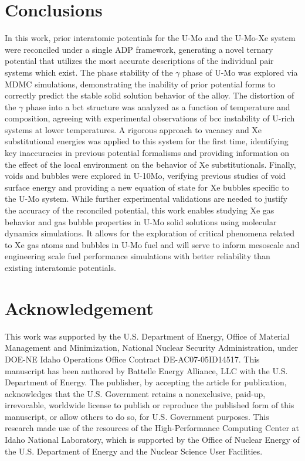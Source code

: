 \documentclass[review]{elsarticle}
\begin{document}
\FloatBarrier

\section{Conclusions}

In this work, prior interatomic potentials for the U-Mo and the U-Mo-Xe system were reconciled under a single ADP framework, generating a novel ternary potential that utilizes the most accurate descriptions of the individual pair systems which exist. The phase stability of the $\gamma$ phase of U-Mo was explored via MDMC simulations, demonstrating the inability of prior potential forms to correctly predict the stable solid solution behavior of the alloy. The distortion of the $\gamma$ phase into a bct structure was analyzed as a function of temperature and composition, agreeing with experimental observations of bcc instability of U-rich systems at lower temperatures. A rigorous approach to vacancy and Xe substitutional energies was applied to this system for the first time, identifying key inaccuracies in previous potential formalisms and providing information on the effect of the local environment on the behavior of Xe substitutionals. Finally, voids and bubbles were explored in U-10Mo, verifying previous studies of void surface energy and providing a new equation of state for Xe bubbles specific to the U-Mo system. While further experimental validations are needed to justify the accuracy of the reconciled potential, this work enables studying Xe gas behavior and gas bubble properties in U-Mo solid solutions using molecular dynamics simulations. It allows for the exploration of critical phenomena related to Xe gas atoms and bubbles in U-Mo fuel and will serve to inform mesoscale and engineering scale fuel performance simulations with better reliability than existing interatomic potentials.

\section{Acknowledgement}
This work was supported by the U.S. Department of Energy, Office of Material Management and Minimization, National Nuclear Security Administration, under DOE-NE Idaho Operations Office Contract DE-AC07-05ID14517. This manuscript has been authored by Battelle Energy Alliance, LLC with the U.S. Department of Energy. The publisher, by accepting the article for publication, acknowledges that the U.S. Government retains a nonexclusive, paid-up, irrevocable, worldwide license to publish or reproduce the published form of this manuscript, or allow others to do so, for U.S. Government purposes. This research made use of the resources of the High-Performance Computing Center at Idaho National Laboratory, which is supported by the Office of Nuclear Energy of the U.S. Department of Energy and the Nuclear Science User Facilities.



\end{document}
